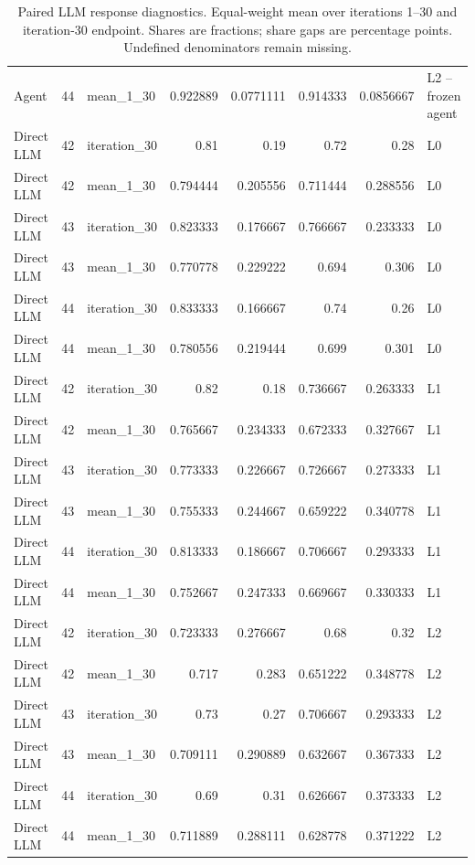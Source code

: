 \begin{table}[htbp!]
\begin{tabular}{lrlrrrrl}
Agent & 44 & mean\_1\_30 & 0.922889 & 0.0771111 & 0.914333 & 0.0856667 & L2 -- frozen agent \\
Direct LLM & 42 & iteration\_30 & 0.81 & 0.19 & 0.72 & 0.28 & L0 \\
Direct LLM & 42 & mean\_1\_30 & 0.794444 & 0.205556 & 0.711444 & 0.288556 & L0 \\
Direct LLM & 43 & iteration\_30 & 0.823333 & 0.176667 & 0.766667 & 0.233333 & L0 \\
Direct LLM & 43 & mean\_1\_30 & 0.770778 & 0.229222 & 0.694 & 0.306 & L0 \\
Direct LLM & 44 & iteration\_30 & 0.833333 & 0.166667 & 0.74 & 0.26 & L0 \\
Direct LLM & 44 & mean\_1\_30 & 0.780556 & 0.219444 & 0.699 & 0.301 & L0 \\
Direct LLM & 42 & iteration\_30 & 0.82 & 0.18 & 0.736667 & 0.263333 & L1 \\
Direct LLM & 42 & mean\_1\_30 & 0.765667 & 0.234333 & 0.672333 & 0.327667 & L1 \\
Direct LLM & 43 & iteration\_30 & 0.773333 & 0.226667 & 0.726667 & 0.273333 & L1 \\
Direct LLM & 43 & mean\_1\_30 & 0.755333 & 0.244667 & 0.659222 & 0.340778 & L1 \\
Direct LLM & 44 & iteration\_30 & 0.813333 & 0.186667 & 0.706667 & 0.293333 & L1 \\
Direct LLM & 44 & mean\_1\_30 & 0.752667 & 0.247333 & 0.669667 & 0.330333 & L1 \\
Direct LLM & 42 & iteration\_30 & 0.723333 & 0.276667 & 0.68 & 0.32 & L2 \\
Direct LLM & 42 & mean\_1\_30 & 0.717 & 0.283 & 0.651222 & 0.348778 & L2 \\
Direct LLM & 43 & iteration\_30 & 0.73 & 0.27 & 0.706667 & 0.293333 & L2 \\
Direct LLM & 43 & mean\_1\_30 & 0.709111 & 0.290889 & 0.632667 & 0.367333 & L2 \\
Direct LLM & 44 & iteration\_30 & 0.69 & 0.31 & 0.626667 & 0.373333 & L2 \\
Direct LLM & 44 & mean\_1\_30 & 0.711889 & 0.288111 & 0.628778 & 0.371222 & L2 \\
\hline
\end{tabular}
\caption{Paired LLM response diagnostics. Equal-weight mean over iterations 1--30 and iteration-30 endpoint. Shares are fractions; share gaps are percentage points. Undefined denominators remain missing.}
\label{chap:results:tab:rq2_llm_action_agreement}
\end{table}
